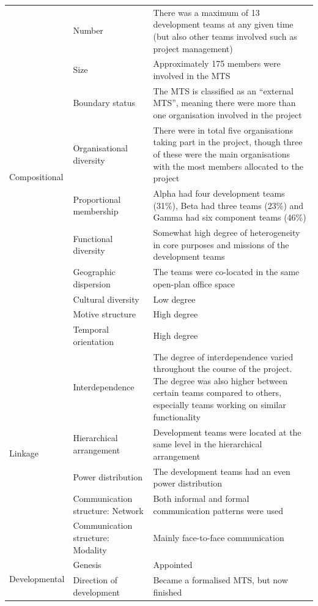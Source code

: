 \begin{center}
\begin{longtable}{ | p{2.5cm} | p{4cm} | p{8cm} | }
	\multirow{10}{*}{Compositional} & Number & There was a maximum of 13 development teams at any given time (but also other teams involved such as project management) \\ \cline{2-3}
 	& Size & Approximately 175 members were involved in the MTS \\ \cline{2-3}
 	& Boundary status & The MTS is classified as an ``external MTS'', meaning there were more than one organisation involved in the project \\ \cline{2-3}
 	& Organisational diversity & There were in total five organisations taking part in the project, though three of these were the main organisations with the most members allocated to the project \\ \cline{2-3}
	& Proportional membership & Alpha had four development teams (31\%), Beta had three teams (23\%) and Gamma had six component teams (46\%) \\ \cline{2-3}
	& Functional diversity & Somewhat high degree of heterogeneity in core purposes and missions of the development teams \\ \cline{2-3}
	& Geographic dispersion & The teams were co-located in the same open-plan office space \\ \cline{2-3}
	& Cultural diversity & Low degree \\ \cline{2-3}
	& Motive structure & High degree \\ \cline{2-3}
	& Temporal orientation & High degree \\ \cline{2-3}
\hline
	\multirow{5}{*}{Linkage} & Interdependence & The degree of interdependence varied throughout the course of the project. The degree was also higher between certain teams compared to others, especially teams working on similar functionality \\ \cline{2-3}
 	& Hierarchical arrangement & Development teams were located at the same level in the hierarchical arrangement \\ \cline{2-3}
 	& Power distribution & The development teams had an even power distribution \\ \cline{2-3}
	& Communication structure: Network & Both informal and formal communication patterns were used \\ \cline{2-3}
	& Communication structure: Modality & Mainly face-to-face communication \\ \cline{2-3}
\hline
	\multirow{6}{*}{Developmental} & Genesis & Appointed \\ \cline{2-3}
 	& Direction of development & Became a formalised MTS, but now finished \\ \cline{2-3}

\end{longtable}
\end{center}

